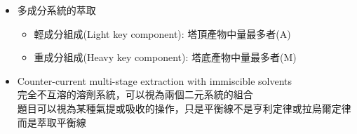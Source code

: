 \documentclass[../main.tex]{subfiles}
\begin{document}
\begin{itemize}
\begin{itemize}
    \begin{equation}
      \frac{y_{C,n}-x_{C,\Delta}}{x_{C,n-1}-x_{C,\Delta}}=\frac{L_{n-1}}{V_n}
    \end{equation}
    而兩式的$\frac{L_{n-1}}{V_n}$相等，因此可得:
    \begin{equation}
      \frac{x_{C,n-1}-x_{C,\Delta}}{x_{A,n-1}-x_{A,\Delta}}=
      \frac{y_{C,n}-x_{C,\Delta}}{y_{A,n}-x_{A,\Delta}}
    \end{equation}
    左邊就是點$(x_{A,n-1},x_{C,n-1})$與點$(x_{A,\Delta},x_{C,\Delta})$的斜率\\
    右邊就是點$(y_{A,n},y_{C,n})$與點$(x_{A,\Delta},x_{C,\Delta})$的斜率\\
    因此可以得到多級連續萃取的總操作線:
    \\
    而出口端L，出口端V，平均組成M點三點共線，則是相同的道理
  \end{itemize}
  \item 多成分系統的萃取
  \begin{itemize}
    \item 輕成分組成(Light key component): 塔頂產物中量最多者(A)
    \item 重成分組成(Heavy key component): 塔底產物中量最多者(M)
  \end{itemize}
  \item Counter-current multi-stage extraction with immiscible solvents\\
  完全不互溶的溶劑系統，可以視為兩個二元系統的組合\\
  題目可以視為某種氣提或吸收的操作，只是平衡線不是亨利定律或拉烏爾定律\\
  而是萃取平衡線
  \end{itemize}
\end{document}

